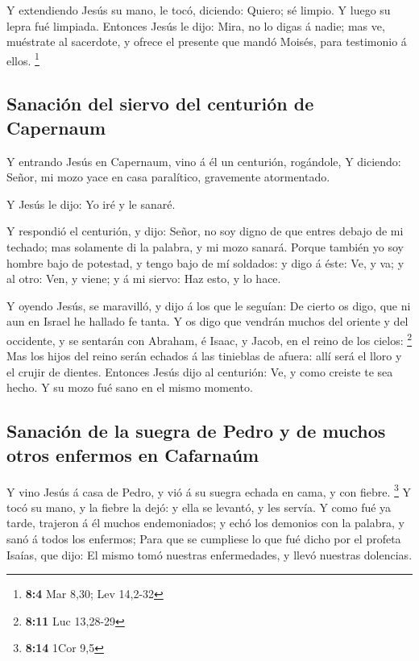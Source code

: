  Y extendiendo Jesús su mano, le tocó, diciendo: Quiero;
sé limpio. Y luego su lepra fué limpiada.  Entonces Jesús
le dijo: Mira, no lo digas á nadie; mas ve, muéstrate al sacerdote, y
ofrece el presente que mandó Moisés, para testimonio á ellos.
\footnote{\textbf{8:4} Mar 8,30; Lev 14,2-32}

\hypertarget{sanaciuxf3n-del-siervo-del-centuriuxf3n-de-capernaum}{%
\subsection{Sanación del siervo del centurión de
Capernaum}\label{sanaciuxf3n-del-siervo-del-centuriuxf3n-de-capernaum}}

 Y entrando Jesús en Capernaum, vino á él un centurión,
rogándole,  Y diciendo: Señor, mi mozo yace en casa
paralítico, gravemente atormentado.

 Y Jesús le dijo: Yo iré y le sanaré.

 Y respondió el centurión, y dijo: Señor, no soy digno de
que entres debajo de mi techado; mas solamente di la palabra, y mi mozo
sanará.  Porque también yo soy hombre bajo de potestad, y
tengo bajo de mí soldados: y digo á éste: Ve, y va; y al otro: Ven, y
viene; y á mi siervo: Haz esto, y lo hace.

 Y oyendo Jesús, se maravilló, y dijo á los que le
seguían: De cierto os digo, que ni aun en Israel he hallado fe tanta.
 Y os digo que vendrán muchos del oriente y del
occidente, y se sentarán con Abraham, é Isaac, y Jacob, en el reino de
los cielos: \footnote{\textbf{8:11} Luc 13,28-29}  Mas
los hijos del reino serán echados á las tinieblas de afuera: allí será
el lloro y el crujir de dientes.  Entonces Jesús dijo al
centurión: Ve, y como creiste te sea hecho. Y su mozo fué sano en el
mismo momento.

\hypertarget{sanaciuxf3n-de-la-suegra-de-pedro-y-de-muchos-otros-enfermos-en-cafarnauxfam}{%
\subsection{Sanación de la suegra de Pedro y de muchos otros enfermos en
Cafarnaúm}\label{sanaciuxf3n-de-la-suegra-de-pedro-y-de-muchos-otros-enfermos-en-cafarnauxfam}}

 Y vino Jesús á casa de Pedro, y vió á su suegra echada
en cama, y con fiebre. \footnote{\textbf{8:14} 1Cor 9,5} 
Y tocó su mano, y la fiebre la dejó: y ella se levantó, y les servía.
 Y como fué ya tarde, trajeron á él muchos endemoniados;
y echó los demonios con la palabra, y sanó á todos los enfermos;
 Para que se cumpliese lo que fué dicho por el profeta
Isaías, que dijo: El mismo tomó nuestras enfermedades, y llevó nuestras
dolencias.

